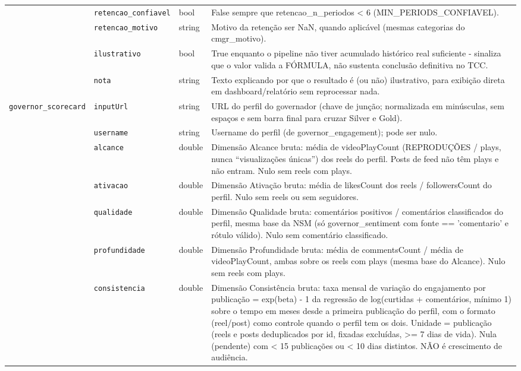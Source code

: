 \begin{footnotesize}
\begin{longtable}{p{3.2cm}p{3.0cm}p{2.0cm}p{6.0cm}}
\texttt{} & \texttt{retencao\_\allowbreak{}confiavel} & bool & False sempre que retencao\_\allowbreak{}n\_\allowbreak{}periodos < 6 (MIN\_\allowbreak{}PERIODS\_\allowbreak{}CONFIAVEL). \\
\texttt{} & \texttt{retencao\_\allowbreak{}motivo} & string & Motivo da retenção ser NaN, quando aplicável (mesmas categorias do cmgr\_\allowbreak{}motivo). \\
\texttt{} & \texttt{ilustrativo} & bool & True enquanto o pipeline não tiver acumulado histórico real suficiente - sinaliza que o valor valida a FÓRMULA, não sustenta conclusão definitiva no TCC. \\
\texttt{} & \texttt{nota} & string & Texto explicando por que o resultado é (ou não) ilustrativo, para exibição direta em dashboard/\allowbreak{}relatório sem reprocessar nada. \\
\texttt{governor\_\allowbreak{}scorecard} & \texttt{inputUrl} & string & URL do perfil do governador (chave de junção; normalizada em minúsculas, sem espaços e sem barra final para cruzar Silver e Gold). \\
\texttt{} & \texttt{username} & string & Username do perfil (de governor\_\allowbreak{}engagement); pode ser nulo. \\
\texttt{} & \texttt{alcance} & double & Dimensão Alcance bruta: média de videoPlayCount (REPRODUÇÕES /\allowbreak{} plays, nunca ``visualizações únicas'') dos reels do perfil. Posts de feed não têm plays e não entram. Nulo sem reels com plays. \\
\texttt{} & \texttt{ativacao} & double & Dimensão Ativação bruta: média de likesCount dos reels /\allowbreak{} followersCount do perfil. Nulo sem reels ou sem seguidores. \\
\texttt{} & \texttt{qualidade} & double & Dimensão Qualidade bruta: comentários positivos /\allowbreak{} comentários classificados do perfil, mesma base da NSM (só governor\_\allowbreak{}sentiment com fonte == 'comentario' e rótulo válido). Nulo sem comentário classificado. \\
\texttt{} & \texttt{profundidade} & double & Dimensão Profundidade bruta: média de commentsCount /\allowbreak{} média de videoPlayCount, ambas sobre os reels com plays (mesma base do Alcance). Nulo sem reels com plays. \\
\texttt{} & \texttt{consistencia} & double & Dimensão Consistência bruta: taxa mensal de variação do engajamento por publicação = exp(beta) - 1 da regressão de log(curtidas + comentários, mínimo 1) sobre o tempo em meses desde a primeira publicação do perfil, com o formato (reel/\allowbreak{}post) como controle quando o perfil tem os dois. Unidade = publicação (reels e posts deduplicados por id, fixadas excluídas, >= 7 dias de vida). Nula (pendente) com < 15 publicações ou < 10 dias distintos. NÃO é crescimento de audiência. \\

\end{longtable}
\end{footnotesize}

